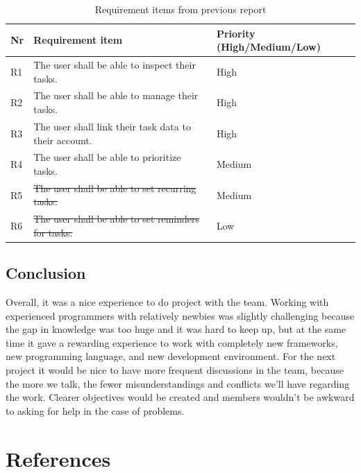 \documentclass{article}
\begin{document}
\begin{table}[H]
  \centering
  \begin{tabularx}{\textwidth}{|l|X|l|}
    \toprule
    \textbf{Nr} & \textbf{Requirement item}                                 & \textbf{Priority (High/Medium/Low)} \\
    \hline
    R1          & The user shall be able to inspect their tasks.            & High                                \\
    \hline
    R2          & The user shall be able to manage their tasks.             & High                                \\
    \hline
    R3          & The user shall link their task data to their account.     & High                                \\
    \hline
    R4          & The user shall be able to prioritize tasks.               & Medium                              \\
    \hline
    R5          & \sout{The user shall be able to set recurring tasks.}     & Medium                              \\
    \hline
    R6          & \sout{The user shall be able to set reminders for tasks.} & Low                                 \\
    \bottomrule
  \end{tabularx}
  \caption{Requirement items from previous report}
  \label{Requirement items from previous report}
\end{table}

\subsection{Conclusion}
Overall, it was a nice experience to do project with the team. Working with experienced programmers with relatively newbies was slightly challenging because the gap in knowledge was too huge and it was hard to keep up, but at the same time it gave a rewarding experience to work with completely new frameworks, new programming language, and new development environment.
For the next project it would be nice to have more frequent discussions in the team, because the more we talk, the fewer misunderstandings and conflicts we’ll have regarding the work. Clearer objectives would be created and members wouldn't be awkward to asking for help in the case of problems.


\clearpage
\section{References}
\printbibliography[heading=none]
\end{document}
